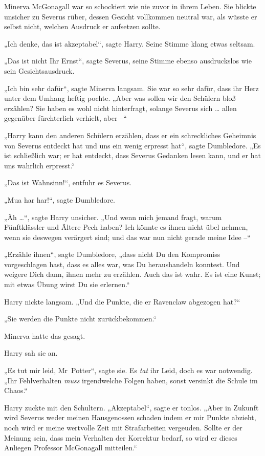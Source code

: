{Minerva McGonagall war so schockiert wie nie zuvor in ihrem Leben. Sie blickte unsicher zu Severus rüber, dessen Gesicht vollkommen neutral war, als wüsste er selbst nicht, welchen Ausdruck er aufsetzen sollte.

„Ich denke, das ist akzeptabel“, sagte Harry. Seine Stimme klang etwas seltsam.

„Das ist nicht Ihr Ernst“, sagte Severus, seine Stimme ebenso ausdruckslos wie sein Gesichtsausdruck.

„Ich bin sehr dafür“, sagte Minerva langsam. Sie war so sehr dafür, dass ihr Herz unter dem Umhang heftig pochte. „Aber was sollen wir den Schülern bloß erzählen? Sie haben es wohl nicht hinterfragt, solange Severus sich … allen gegenüber fürchterlich verhielt, aber --“

„Harry kann den anderen Schülern erzählen, dass er ein schreckliches Geheimnis von Severus entdeckt hat und uns ein wenig erpresst hat“, sagte Dumbledore. „Es ist schließlich war; er hat entdeckt, dass Severus Gedanken lesen kann, und er hat uns wahrlich erpresst.“

„Das ist Wahnsinn!“, entfuhr es Severus.

„Mua har har!“, sagte Dumbledore.

„Äh …“, sagte Harry unsicher. „Und wenn mich jemand fragt, warum Fünftklässler und Ältere Pech haben? Ich könnte es ihnen nicht übel nehmen, wenn sie deswegen verärgert sind; und das war nun nicht gerade meine Idee --“

„Erzähle ihnen“, sagte Dumbledore, „dass nicht Du den Kompromiss vorgeschlagen hast, dass es alles war, was Du heraushandeln konntest. Und weigere Dich dann, ihnen mehr zu erzählen. Auch das ist wahr. Es ist eine Kunst; mit etwas Übung wirst Du sie erlernen.“

Harry nickte langsam. „Und die Punkte, die er Ravenclaw abgezogen hat?“

„Sie werden die Punkte nicht zurückbekommen.“

Minerva hatte das gesagt.

Harry sah sie an.

„Es tut mir leid, Mr~Potter“, sagte sie. Es \emph{tat} ihr Leid, doch es war notwendig. „Ihr Fehlverhalten \emph{muss} irgendwelche Folgen haben, sonst versinkt die Schule im Chaos.“

Harry zuckte mit den Schultern. „Akzeptabel“, sagte er tonlos. „Aber in Zukunft wird Severus weder meinen Hausgenossen schaden indem er mir Punkte abzieht, noch wird er meine wertvolle Zeit mit Strafarbeiten vergeuden. Sollte er der Meinung sein, dass mein Verhalten der Korrektur bedarf, so wird er dieses Anliegen Professor McGonagall mitteilen.“

}
